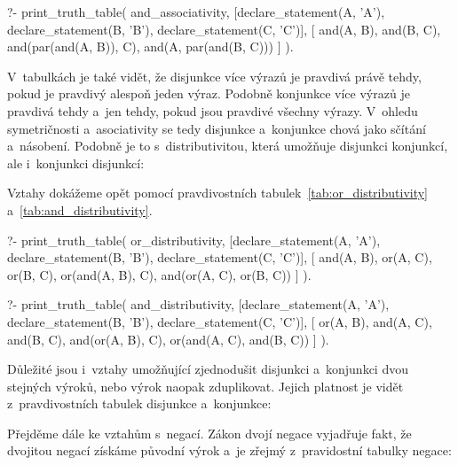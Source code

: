 \begin{prolog}
?- print_truth_table(
	and_associativity,
	[declare_statement(A, 'A'), declare_statement(B, 'B'), declare_statement(C, 'C')],
	[
		and(A, B),
		and(B, C),
		and(par(and(A, B)), C),
		and(A, par(and(B, C)))
	]
).
\end{prolog}

V~tabulkách je také vidět, že disjunkce více výrazů je pravdivá právě tehdy, pokud je pravdivý alespoň jeden výraz. Podobně konjunkce více výrazů je pravdivá tehdy a~jen tehdy, pokud jsou pravdivé všechny výrazy. V~ohledu symetričnosti a~asociativity se tedy disjunkce a~konjunkce chová jako sčítání a~násobení. Podobně je to s~distributivitou, která umožňuje  disjunkci konjunkcí, ale i~konjunkci disjunkcí:


Vztahy dokážeme opět pomocí pravdivostních tabulek~\ref{tab:or_distributivity} a~\ref{tab:and_distributivity}.

\begin{prolog}
?- print_truth_table(
	or_distributivity,
	[declare_statement(A, 'A'), declare_statement(B, 'B'), declare_statement(C, 'C')],
	[
		and(A, B),
		or(A, C),
		or(B, C),
		or(and(A, B), C),
		and(or(A, C), or(B, C))
	]
).
\end{prolog}

\begin{prolog}
?- print_truth_table(
	and_distributivity,
	[declare_statement(A, 'A'), declare_statement(B, 'B'), declare_statement(C, 'C')],
	[
		or(A, B),
		and(A, C),
		and(B, C),
		and(or(A, B), C),
		or(and(A, C), and(B, C))
	]
).
\end{prolog}

Důležité jsou i~vztahy umožňující zjednodušit disjunkci a~konjunkci dvou stejných výroků, nebo výrok naopak zduplikovat. Jejich platnost je vidět z~pravdivostních tabulek disjunkce a~konjunkce:


Přejděme dále ke vztahům s~negací. Zákon dvojí negace vyjadřuje fakt, že dvojitou negací získáme původní výrok a~je zřejmý z~pravidostní tabulky negace:


